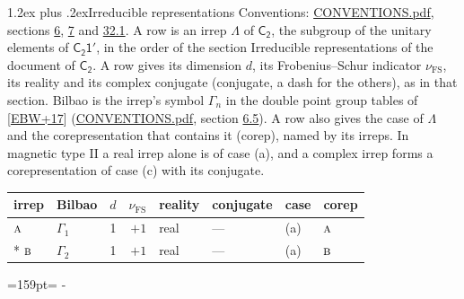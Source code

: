 \documentclass[10pt,a4paper]{article}
\makeatletter
\renewcommand\section{\@startsection{section}{1}{\z@}{-3ex plus -1ex minus -.2ex}%
  {1.2ex plus .2ex}{\normalfont\large\sffamily\bfseries\color{parttitle}}}
\newcommand{\needspace}[1]{\par\penalty-100\begingroup\dimen0=#1\relax\dimen2=\pagegoal
  \advance\dimen2-\pagetotal\ifdim\dimen0>\dimen2\relax\ifdim\dimen2>0pt\vfil\break\fi\fi
  \endgroup}
\numberwithin{equation}{section}
\newcommand{\grp}[1]{\mathsf{#1}}
\newcommand{\irr}[1]{\text{\normalfont\scshape #1}}
\newcommand{\fsind}{\nu_{\mathrm{FS}}}
\makeatother
\begin{document}
\section{Irreducible representations}\label{s:irreps}
Conventions: \href{../../CONVENTIONS.pdf}{CONVENTIONS.pdf}, sections \href{../../../rotation/CONVENTIONS.pdf\#conv.6}{6}, \href{../../../rotation/CONVENTIONS.pdf\#conv.7}{7} and \href{../../CONVENTIONS.pdf\#conv.32.1}{32.1}.
\leavevmode\label{n:irrep.Delta}A row is an irrep $\Lambda$ of $\grp{C_{2}}$, the subgroup of the unitary elements of $\grp{C_{2}1'}$, in the order of the section Irreducible representations of the document of \href{../../../rotation/data/pdf/C2.pdf}{$\grp{C_{2}}$}. \label{n:index.dimension}\label{n:index.frobenius}\label{n:head.irrep}\label{n:head.reality}\label{n:head.conjugate}A row gives its dimension $d$, its Frobenius--Schur indicator $\fsind$, its reality and its complex conjugate (conjugate, a dash for the others), as in that section. \label{n:head.bilbao}\label{n:irrep.alias.gamma}Bilbao is the irrep's symbol $\Gamma_n$ in the double point group tables of [\href{../../../REFERENCES.pdf\#ref.EBW+17}{EBW+17}] (\href{../../CONVENTIONS.pdf}{CONVENTIONS.pdf}, section \href{../../../rotation/CONVENTIONS.pdf\#conv.6.5}{6.5}). \label{n:head.case.corep}\label{n:head.corep}A row also gives the case of $\Lambda$ and the corepresentation that contains it (corep), named by its irreps. In magnetic type II a real irrep alone is of case (a), and a complex irrep forms a corepresentation of case (c) with its conjugate.
\setlength{\emergencystretch}{2em}\par\setlength{\emergencystretch}{0pt}
{\small\renewcommand{\arraystretch}{1.25}\setlength{\tabcolsep}{4pt}\begin{longtable}{@{}llrrllll@{}}\toprule
irrep & Bilbao & $d$ & $\fsind$ & reality & conjugate & case & corep\\\midrule\endhead
\bottomrule\endfoot\endlastfoot
$\irr{a}$ & $\Gamma_{1}$ & 1 & $+1$ & real & --- & (a) & $\irr{a}$\\*
$\irr{b}$ & $\Gamma_{2}$ & 1 & $+1$ & real & --- & (a) & $\irr{b}$\\
\bottomrule\end{longtable}}
\needspace{159pt}
\end{document}
